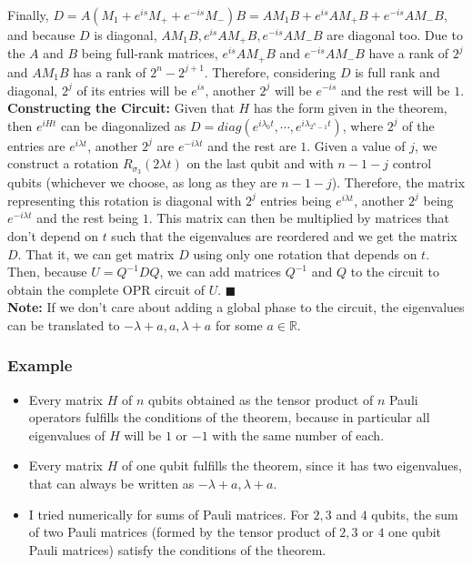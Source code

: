 Finally, $D = A(M_1 + e^{is} M_+ + e^{-is} M_-) B = AM_1 B + e^{is} AM_+ B + e^{-is} AM_- B$,
and because $D$ is diagonal, $AM_1B , e^{is} AM_+B, e^{-is} AM_- B$ are
diagonal too. Due to the $A$ and $B$ being full-rank matrices, $e^{is} AM_+B$ 
and $e^{-is} AM_-B$ have a rank of $2^j$ and $AM_1B$ has a rank of $2^n- 2^{j+1}$. 
Therefore, considering $D$ is full rank and diagonal, 
$2^j$ of its entries will be $e^{is}$, another $2^j$ will be $e^{-is}$
and the rest will be $1$. \\

\textbf{Constructing the 
Circuit:}  Given that $H$ has the form given in the theorem,
then $e^{iHt}$ can be diagonalized as $D = diag(e^{i\lambda_0 t}, \cdots , e^{i\lambda_{2^n-1}t})$,
where $2^j$ of the entries are $e^{i\lambda t}$, another $2^j$ are $e^{-i\lambda t}$ 
and the rest are $1$. 
Given a value of $j$, we construct a rotation $R_{\sigma_3}(2\lambda t)$ on the last qubit and with $n-1-j$ control qubits 
(whichever we choose, as long as they are $n-1-j$).
Therefore, the matrix representing this rotation is diagonal with $2^j$
entries being $e^{i\lambda t}$, another $2^j$ being $e^{-i\lambda t}$ and the rest being $1$.
This matrix can then be multiplied by matrices that don't depend on $t$
such that the eigenvalues are reordered and we get the matrix $D$.
That it, we can get matrix $D$ using only one rotation that depends on $t$. 
Then, because $U = Q^{-1} D Q$, we can add matrices $Q^{-1}$ and $Q$ to the circuit
to obtain the complete OPR circuit of $U$. $\blacksquare$ \\ 

\textbf{Note:} If we don't care about adding a global phase to the circuit, the eigenvalues can be translated to $-\lambda+a, a, \lambda+a$ for some $a\in \mathbb{R}$.\\

\subsubsection{Example}
\begin{itemize}
\item  Every matrix $H$ of $n$ qubits obtained as the
tensor product of $n$ Pauli operators fulfills the conditions of the theorem, 
because in particular all eigenvalues of $H$ will
be $1$ or $-1$ with the same number of each. 
\item Every matrix $H$ of one qubit fulfills the theorem, since it has two eigenvalues, that can always be written as $-\lambda+a, \lambda+a$.
\item I tried numerically for sums of Pauli matrices. For $2,3$ and $4$ qubits, the sum of two Pauli matrices (formed by the tensor product of $2,3$ or $4$ one qubit Pauli matrices) satisfy the conditions of the theorem.\\
\end{itemize}


